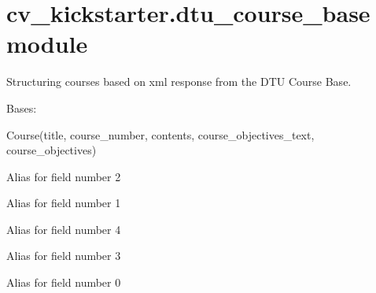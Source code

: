 \documentclass[letterpaper,10pt,english]{sphinxmanual}
\begin{document}
\section{cv\_kickstarter.dtu\_course\_base module}
\label{cv_kickstarter:module-cv_kickstarter.dtu_course_base}\label{cv_kickstarter:cv-kickstarter-dtu-course-base-module}
Structuring courses based on xml response from the DTU Course Base.

\begin{fulllineitems}
\label{cv_kickstarter:cv_kickstarter.dtu_course_base.Course}
Bases: 

Course(title, course\_number, contents, course\_objectives\_text, course\_objectives)

\begin{fulllineitems}
\label{cv_kickstarter:cv_kickstarter.dtu_course_base.Course.contents}
Alias for field number 2

\end{fulllineitems}


\begin{fulllineitems}
\label{cv_kickstarter:cv_kickstarter.dtu_course_base.Course.course_number}
Alias for field number 1

\end{fulllineitems}


\begin{fulllineitems}
\label{cv_kickstarter:cv_kickstarter.dtu_course_base.Course.course_objectives}
Alias for field number 4

\end{fulllineitems}


\begin{fulllineitems}
\label{cv_kickstarter:cv_kickstarter.dtu_course_base.Course.course_objectives_text}
Alias for field number 3

\end{fulllineitems}


\begin{fulllineitems}
\label{cv_kickstarter:cv_kickstarter.dtu_course_base.Course.title}
Alias for field number 0

\end{fulllineitems}


\end{fulllineitems}
\end{document}
